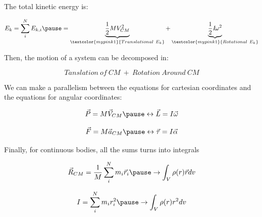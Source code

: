 \documentclass[]{beamer}
\begin{document}
\begin{frame}

  The total kinetic energy is:
  
  \pause
  \vspace{3mm}
  
  \begin{equation}
    E_k=\sum^N_i E_{k,i} \pause=\underbrace{\frac{1}{2}MV^2_{CM}}_{\textcolor{mypink1}{Translational~E_k}}+\underbrace{\frac{1}{2}\textit{I}\omega^2}_{\textcolor{mypink1}{Rotational~E_k}}
  \end{equation}
  
  \pause
  \vspace{3mm}
  
  Then, the motion of a system can be decomposed in:
  
  \pause 
  \begin{equation*}
    Tanslation~of~CM~+~Rotation~Around~CM
  \end{equation*}
  
  
  \end{frame}
\begin{frame}

  We can make a parallelism between the equations for cartesian coordinates and the equations for angular coordinates:

  
  \pause
  
  \begin{equation}
\vec{P}=M\vec{V}_{CM} \pause \leftrightarrow \vec{L}=I\vec{\omega }
  \end{equation}

  \pause
  
  \begin{equation}
\vec{F}=M\vec{a}_{CM}\pause \leftrightarrow \vec{\tau}=I\vec{\alpha }
  \end{equation}


  \end{frame}
\begin{frame}

Finally, for continuous bodies, all the sums turns into integrals
  


\begin{equation}
  \vec{R}_{CM}=\frac{1}{M}\sum^N_i m_i \vec{r}_i \pause \rightarrow \int_V \rho(r) \vec{r} dv
\end{equation}

  \pause

\begin{equation}
    I=\sum^N_i m_i r^2_i \pause \rightarrow \int_V \rho(r) r^2 dv
\end{equation}


\pause



  \end{frame}

  
      

 
\end{document}
